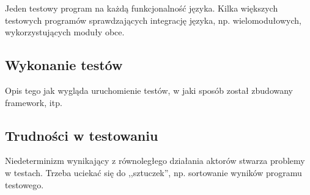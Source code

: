 Jeden testowy program na każdą funkcjonalność języka.
Kilka większych testowych programów sprawdzających integrację języka, np. wielomodułowych, wykorzystujących
moduły obce.

\subsection{Wykonanie testów}

Opis tego jak wygląda uruchomienie testów, w jaki sposób został zbudowany framework, itp.

\subsection{Trudności w testowaniu}

Niedeterminizm wynikający z równoległego działania aktorów stwarza problemy w testach. Trzeba uciekać się do
,,sztuczek'', np. sortowanie wyników programu testowego.


